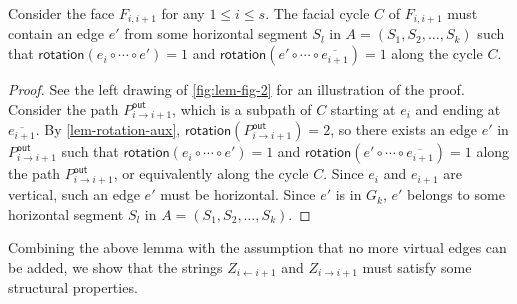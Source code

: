 \documentclass{theoretics}
\newcommand{\Pout}{P^{\mathsf{out}}}
\newcommand{\rotation}{\mathsf{rotation}}
\begin{document}
\begin{lemma}\label{lem-horizontal-exist}
Consider the face $F_{i,i+1}$ for any $1 \leq i \leq s$. The facial cycle $C$ of $F_{i,i+1}$ must contain an edge $e'$ from some horizontal segment $S_l$ in $A=(S_1, S_2, \ldots, S_k)$ such that $\rotation(e_i \circ \cdots \circ e')=1$  and $\rotation(e' \circ \cdots \circ \overline{e_{i+1}})=1$ along the cycle $C$.
\end{lemma}
\begin{proof}
 See the left drawing of \cref{fig:lem-fig-2} for an illustration of the proof. Consider the path $\Pout_{i\rightarrow i+1}$, which is a subpath of $C$ starting at $e_i$ and ending at $\overline{e_{i+1}}$. By \cref{lem-rotation-aux},  $\rotation(\Pout_{i\rightarrow i+1}) = 2$, so there exists an edge $e'$ in $\Pout_{i\rightarrow i+1}$ such that $\rotation(e_i \circ \cdots \circ e')=1$  and $\rotation(e' \circ \cdots \circ \overline{e_{i+1}})=1$ along the path $\Pout_{i\rightarrow i+1}$, or equivalently along the cycle $C$. Since $e_i$ and $e_{i+1}$ are vertical, such an edge $e'$ must be horizontal. Since $e'$ is in $G_k$, $e'$ belongs to some horizontal segment $S_l$ in $A=(S_1, S_2, \ldots, S_k)$. 
\end{proof}

Combining the above lemma with the assumption that no more virtual edges can be added, we show that the strings $Z_{i \leftarrow i+1}$ and $Z_{i \rightarrow i+1}$ must satisfy some structural properties.
\end{document}
